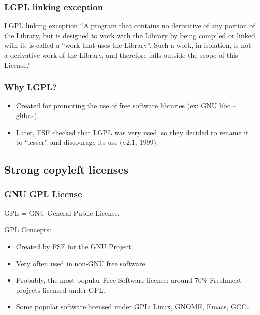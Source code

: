 \begin{frame}
\frametitle{LGPL linking exception}
\begin{block}{LGPL linking exception}
``A program that contains no derivative of any portion of the Library, but is designed to work with the Library by being compiled or linked with it, is called a ``work that uses the Library''. Such a work, in isolation, is not a derivative work of the Library, and therefore falls outside the scope of this License.''

\end{block}
\end{frame}


\begin{frame}
\frametitle{Why LGPL?}


\begin{itemize}
\item Created for promoting the use of free software libraries (ex: GNU libc --glibc--).
\item Later, FSF checked that LGPL was very used, so they decided to rename it 
  to ``lesser'' and discourage its use (v2.1, 1999).
\end{itemize}

\end{frame}


\subsection{Strong copyleft licenses}

\begin{frame}
\frametitle{GNU GPL License}

\begin{center}
\item GPL = GNU General Public License.
\end{center}

GPL Concepts:
\begin{itemize}
\item Created by FSF for the GNU Project.
\item Very often used in non-GNU free software.
\item Probably, the most popular Free Software license: around 70\%
  Freshmeat projects licensed under GPL.
\item Some popular software licensed under GPL: Linux, GNOME, Emacs,
 GCC\ldots
\end{itemize}

\end{frame}


